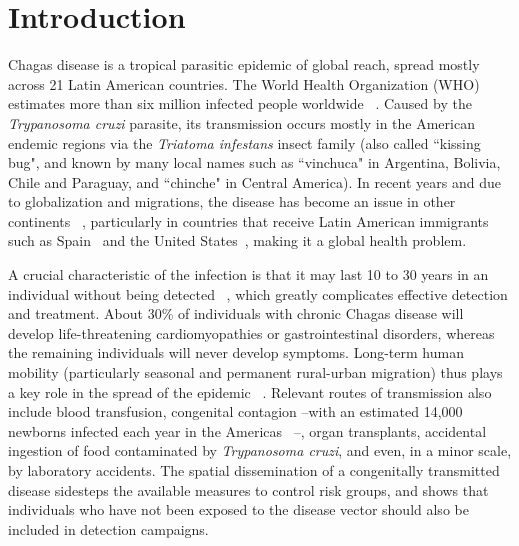 
\chapter{Introduction} \label{cha:intro}

Chagas disease is a tropical parasitic epidemic of global reach, spread mostly across 21 Latin American countries. The World Health Organization (WHO) estimates more than six million infected people worldwide ~\textcite{who2016}. Caused by the \textit{Trypanosoma cruzi} parasite, its transmission occurs mostly in the American endemic regions via the \textit{Triatoma infestans} insect family (also called ``kissing bug", and known by many local names such as ``vinchuca" in Argentina, Bolivia, Chile and Paraguay, and ``chinche" in Central America). In recent years and due to globalization and migrations, the disease has become an %
issue in other continents ~\textcite{schmunis2010chagas}, 
particularly in countries that receive Latin American immigrants such as Spain~\textcite{navarro2012chagas} and the United States~\textcite{hotez2013unfolding}, 
making it a global health problem.

A crucial characteristic of the infection is that it may last 10 to 30 years in an individual without being detected~ \textcite{rassi2012american}, which greatly complicates effective detection and treatment. About 30\% of individuals with chronic Chagas disease will develop life-threatening cardiomyopathies or gastrointestinal disorders, whereas 
the remaining individuals will never develop symptoms.
Long-term human mobility (particularly seasonal and permanent rural-urban migration) thus plays a key role in the spread of the epidemic~ \textcite{briceno2009chagas}. Relevant routes of transmission also include blood transfusion, congenital contagion --with an estimated 14,000 newborns infected each year in the Americas~ \textcite{OPS2006chagas}--,
organ transplants, 
accidental ingestion of food contaminated by \textit{Trypanosoma cruzi}, and even, in a minor scale, 
by laboratory accidents.
The spatial dissemination of a congenitally transmitted disease sidesteps the available measures to control risk groups, and shows that individuals who have not been exposed to the disease vector should also be included in detection campaigns.

